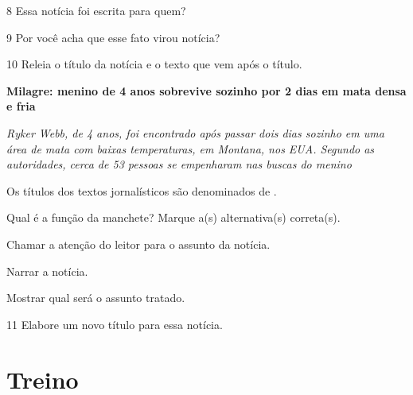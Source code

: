 \begin{conteudo}
\begin{conteudo}
\begin{conteudo}
\begin{conteudo}

\num{8} Essa notícia foi escrita para quem?


\num{9} Por você acha que esse fato virou notícia?


\num{10} Releia o título da notícia e o texto que vem após o título.

\begin{myquote}
\textbf{Milagre: menino de 4 anos sobrevive sozinho por 2 dias em mata densa e fria}

\emph{Ryker Webb, de 4 anos, foi encontrado após passar dois dias
sozinho em uma área de mata com baixas temperaturas, em Montana, nos
EUA. Segundo as autoridades, cerca de 53 pessoas se empenharam nas
buscas do menino}
\end{myquote}


\item Os títulos dos textos jornalísticos são denominados de .

\item Qual é a função da manchete? Marque a(s) alternativa(s) correta(s).

\begin{escolha}
\begin{boxlist}
 Chamar a atenção do leitor para o assunto da notícia.

 Narrar a notícia.

 Mostrar qual será o assunto tratado.
\end{boxlist}
\end{escolha}

\num{11} Elabore um novo título para essa notícia.



\section*{Treino}


\end{conteudo}
\end{conteudo}
\end{conteudo}
\end{conteudo}
